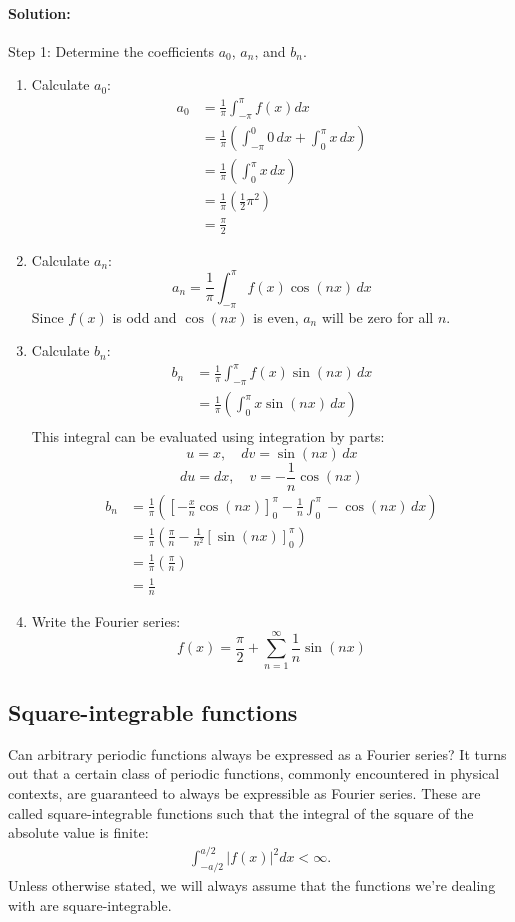 \paragraph{Solution:} Step 1: Determine the coefficients \( a_0 \), \( a_n \), and \( b_n \).
\begin{enumerate}
	\item Calculate \( a_0 \):
		\begin{align*}
			a_0 &= \frac{1}{\pi} \int_{-\pi}^{\pi} f(x) dx \\
				&= \frac{1}{\pi} \left( \int_{-\pi}^{0} 0 \, dx + \int_{0}^{\pi} x \, dx \right) \\
				&= \frac{1}{\pi} \left( \int_{0}^{\pi} x \, dx \right) \\
				&= \frac{1}{\pi} \left( \frac{1}{2} \pi^2 \right) \\
				&= \frac{\pi}{2} 
		\end{align*}
	\item Calculate \( a_n \): \[ a_n = \frac{1}{\pi} \int_{-\pi}^{\pi} f(x) \cos(nx) \, dx \]
Since \( f(x) \) is odd and \( \cos(nx) \) is even, \( a_n \) will be zero for all \( n \).
	\item Calculate \( b_n \):
		\begin{align*}
			b_n &= \frac{1}{\pi} \int_{-\pi}^{\pi} f(x) \sin(nx) \, dx \\
				&= \frac{1}{\pi} \left( \int_{0}^{\pi} x \sin(nx) \, dx \right) \\
		\end{align*}
		This integral can be evaluated using integration by parts:
\[ u = x, \quad dv = \sin(nx) \, dx \]
\[ du = dx, \quad v = -\frac{1}{n} \cos(nx) \]
\begin{align*}
	b_n &= \frac{1}{\pi} \left( \left[ -\frac{x}{n} \cos(nx) \right]_{0}^{\pi} - \frac{1}{n} \int_{0}^{\pi} -\cos(nx) \, dx \right)\\
		&= \frac{1}{\pi} \left( \frac{\pi}{n} - \frac{1}{n^2} \left[ \sin(nx) \right]_{0}^{\pi} \right)\\
		&= \frac{1}{\pi} \left( \frac{\pi}{n} \right) \\
		&= \frac{1}{n} 
\end{align*}
	\item Write the Fourier series:
\[ f(x) = \frac{\pi}{2} + \sum_{n=1}^{\infty} \frac{1}{n} \sin(nx) \]
\end{enumerate}




\subsection{Square-integrable functions}
Can arbitrary periodic functions always be expressed as a Fourier series? It turns out that a certain class of periodic functions, commonly encountered in physical contexts, are guaranteed to always be expressible as Fourier series. These are called square-integrable functions such that the integral of the square of the absolute value is finite:
\begin{align*}
\int_{-a/2}^{a/2}|f(x)|^2 dx < \infty.
\end{align*}
Unless otherwise stated, we will always assume that the functions we're dealing with are square-integrable.

